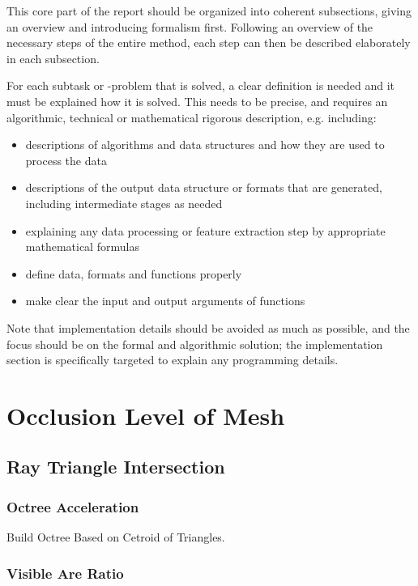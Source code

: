 \documentclass[11pt, a4paper,oneside,chapterprefix=false]{scrbook}
\begin{document}
This core part of the report should be organized into coherent subsections, giving an overview and introducing formalism first. Following an overview of the necessary steps of the entire method, each step can then be described elaborately in each subsection.

For each subtask or -problem that is solved, a clear definition is needed and it must be explained how it is solved. This needs to be precise, and requires an algorithmic, technical or mathematical rigorous description, e.g. including:

\begin{itemize}
\item descriptions of algorithms and data structures and how they are used to process the data
\item descriptions of the output data structure or formats that are generated, including intermediate stages as needed
\item explaining any data processing or feature extraction step by appropriate mathematical formulas
\item define data, formats and functions properly
\item make clear the input and output arguments of functions
\end{itemize}

Note that implementation details should be avoided as much as possible, and the focus should be on the formal and algorithmic solution; the implementation section is specifically targeted to explain any programming details.

\section{Occlusion Level of Mesh}

\subsection{Ray Triangle Intersection}

\subsubsection{Octree Acceleration}
Build Octree Based on Cetroid of Triangles.

\subsubsection{Visible Are Ratio}
\end{document}
